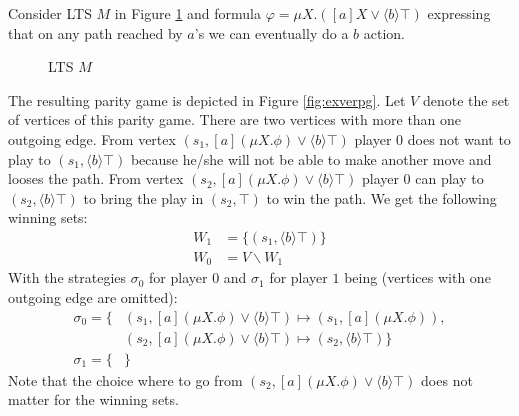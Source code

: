 \begin{example}
	Consider LTS $M$ in Figure \ref{fig:exverltsprojempty} and formula $\varphi = \mu X.([a]X \vee \langle b \rangle \top)$ expressing that on any path reached by $a$'s we can eventually do a $b$ action.
	\begin{figure}[h]
		\centering
		\caption[LTS $M$]{LTS $M$}
		\label{fig:exverltsprojempty}
	\end{figure}

	The resulting parity game is depicted in Figure \ref{fig:exverpg}. Let $V$ denote the set of vertices of this parity game. There are two vertices with more than one outgoing edge. From vertex $(s_1, [a](\mu X.\phi) \vee \langle b \rangle \top)$ player 0 does not want to play to $(s_1, \langle b \rangle \top)$ because he/she will not be able to make another move and looses the path. From vertex $(s_2, [a](\mu X.\phi)  \vee \langle b \rangle \top)$ player 0 can play to $(s_2, \langle b \rangle \top)$ to bring the play in $(s_2,\top)$ to win the path. We get the following winning sets:
	\begin{align*}
	W_1 &= \{ (s_1, \langle b \rangle \top )\}\\
	W_0 &= V \backslash W_1
	\end{align*}
	With the strategies $\sigma_0$ for player $0$ and $\sigma_1$ for player $1$ being (vertices with one outgoing edge are omitted):
	\begin{align*}
	\sigma_0 = \{
	&(s_1, [a](\mu X. \phi) \vee \langle b \rangle \top) \mapsto (s_1, [a] (\mu X. \phi)), \\
	&(s_2, [a](\mu X. \phi) \vee \langle b \rangle \top) \mapsto (s_2, \langle b \rangle \top) \} \\
	\sigma_1 = \{&\}
	\end{align*}
	Note that the choice where to go from $(s_2, [a](\mu X.\phi) \vee \langle b \rangle \top)$ does not matter for the winning sets.
	\begin{figure}[h]
		\centering
\end{figure}
\end{example}
